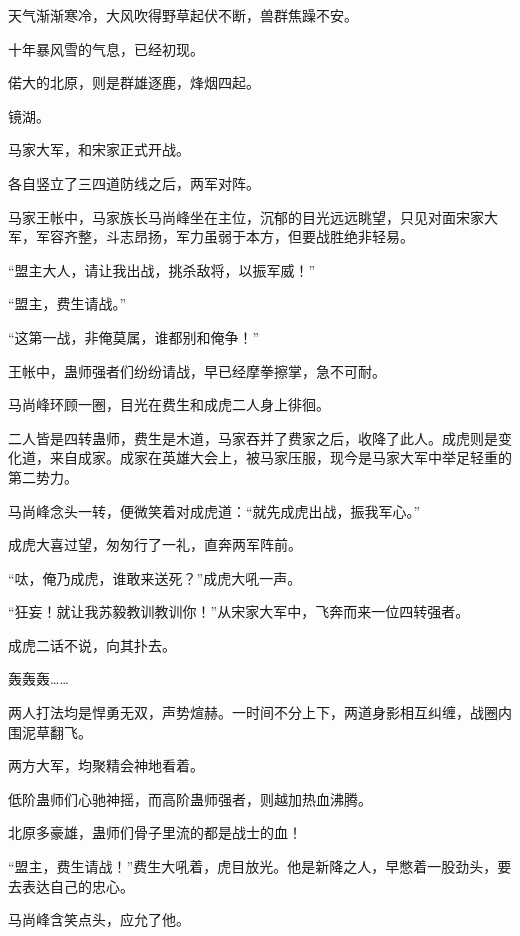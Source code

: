 
\begin{this_body}



天气渐渐寒冷，大风吹得野草起伏不断，兽群焦躁不安。

十年暴风雪的气息，已经初现。

偌大的北原，则是群雄逐鹿，烽烟四起。

镜湖。

马家大军，和宋家正式开战。

各自竖立了三四道防线之后，两军对阵。

马家王帐中，马家族长马尚峰坐在主位，沉郁的目光远远眺望，只见对面宋家大军，军容齐整，斗志昂扬，军力虽弱于本方，但要战胜绝非轻易。

“盟主大人，请让我出战，挑杀敌将，以振军威！”

“盟主，费生请战。”

“这第一战，非俺莫属，谁都别和俺争！”

王帐中，蛊师强者们纷纷请战，早已经摩拳擦掌，急不可耐。

马尚峰环顾一圈，目光在费生和成虎二人身上徘徊。

二人皆是四转蛊师，费生是木道，马家吞并了费家之后，收降了此人。成虎则是变化道，来自成家。成家在英雄大会上，被马家压服，现今是马家大军中举足轻重的第二势力。

马尚峰念头一转，便微笑着对成虎道：“就先成虎出战，振我军心。”

成虎大喜过望，匆匆行了一礼，直奔两军阵前。

“呔，俺乃成虎，谁敢来送死？”成虎大吼一声。

“狂妄！就让我苏毅教训教训你！”从宋家大军中，飞奔而来一位四转强者。

成虎二话不说，向其扑去。

轰轰轰……

两人打法均是悍勇无双，声势煊赫。一时间不分上下，两道身影相互纠缠，战圈内围泥草翻飞。

两方大军，均聚精会神地看着。

低阶蛊师们心驰神摇，而高阶蛊师强者，则越加热血沸腾。

北原多豪雄，蛊师们骨子里流的都是战士的血！

“盟主，费生请战！”费生大吼着，虎目放光。他是新降之人，早憋着一股劲头，要去表达自己的忠心。

马尚峰含笑点头，应允了他。


\end{this_body}
